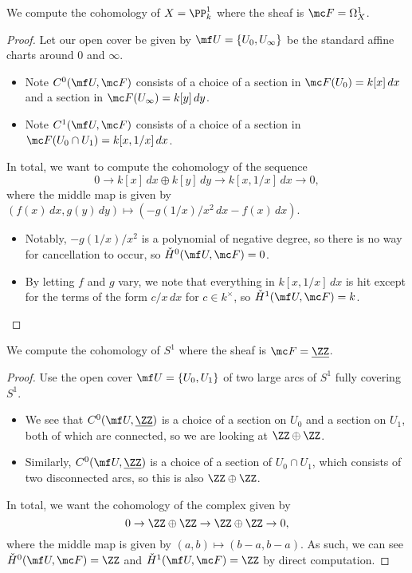 \documentclass[../notes.tex]{subfiles}
\begin{document}
\begin{exe}
	We compute the cohomology of $X=\PP^1_k$ where the sheaf is $\mc F=\Omega^1_X$.
\end{exe}
\begin{proof}
	Let our open cover be given by $\mf U=\{U_0,U_\infty\}$ be the standard affine charts around $0$ and $\infty$.
	\begin{itemize}
		\item Note $C^0(\mf U,\mc F)$ consists of a choice of a section in $\mc F(U_0)=k[x]\,dx$ and a section in $\mc F(U_\infty)=k[y]\,dy$.
		\item Note $C^1(\mf U,\mc F)$ consists of a choice of a section in $\mc F(U_0\cap U_1)=k[x,1/x]\,dx$.
	\end{itemize}
	In total, we want to compute the cohomology of the sequence
	\[0\to k[x]\,dx\oplus k[y]\,dy\to k[x,1/x]\,dx\to0,\]
	where the middle map is given by $(f(x)\,dx,g(y)\,dy)\mapsto(-g(1/x)/x^2\,dx-f(x)\,dx)$.
	\begin{itemize}
		\item Notably, $-g(1/x)/x^2$ is a polynomial of negative degree, so there is no way for cancellation to occur, so $\check H^0(\mf U,\mc F)=0$.
		\item By letting $f$ and $g$ vary, we note that everything in $k[x,1/x]\,dx$ is hit except for the terms of the form $c/x\,dx$ for $c\in k^\times$, so $\check H^1(\mf U,\mc F)=k$.
		\qedhere
	\end{itemize}
\end{proof}
\begin{exe}
	We compute the cohomology of $S^1$ where the sheaf is $\mc F=\underline\ZZ$.
\end{exe}
\begin{proof}
	Use the open cover $\mf U=\{U_0,U_1\}$ of two large arcs of $S^1$ fully covering $S^1$.
	\begin{itemize}
		\item We see that $C^0(\mf U,\underline\ZZ)$ is a choice of a section on $U_0$ and a section on $U_1$, both of which are connected, so we are looking at $\ZZ\oplus\ZZ$.
		\item Similarly, $C^0(\mf U,\underline\ZZ)$ is a choice of a section of $U_0\cap U_1$, which consists of two disconnected arcs, so this is also $\ZZ\oplus\ZZ$.
	\end{itemize}
	In total, we want the cohomology of the complex given by
	\[0\to\ZZ\oplus\ZZ\to\ZZ\oplus\ZZ\to0,\]
	where the middle map is given by $(a,b)\mapsto(b-a,b-a)$. As such, we can see $\check H^0(\mf U,\mc F)=\ZZ$ and $\check H^1(\mf U,\mc F)=\ZZ$ by direct computation.
\end{proof}
\end{document}
